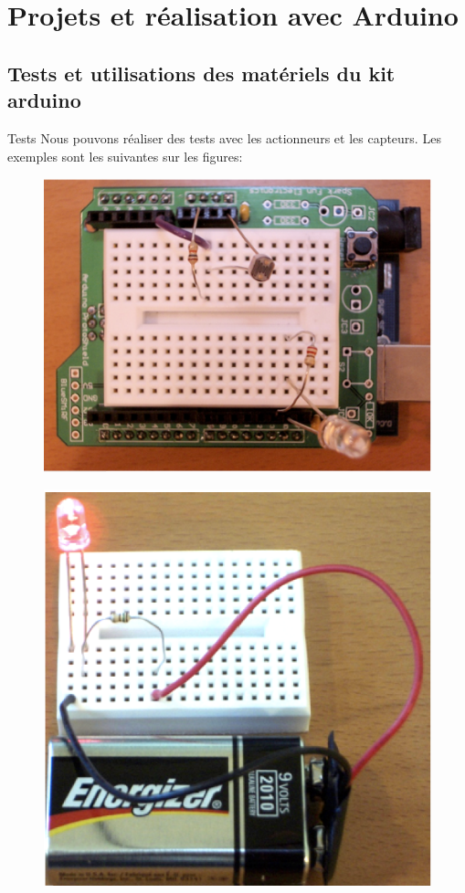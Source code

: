 \documentclass[]{beamer}
\begin{document}
	\section{Projets et réalisation avec Arduino}
	\subsection{Tests et utilisations des matériels du kit arduino}
	\begin{frame}
		{Tests}
			Nous pouvons réaliser des tests avec les actionneurs et les 
			capteurs. Les exemples sont les suivantes sur les figures:
			\begin{figure}
				\begin{center}
					\includegraphics[scale=0.5]{test1.png}
				\end{center}
			\end{figure}
			\begin{figure}
				\begin{center}
					\includegraphics[scale=0.5]{test2.png}

\end{center}
\end{figure}
\end{frame}
\end{document}
